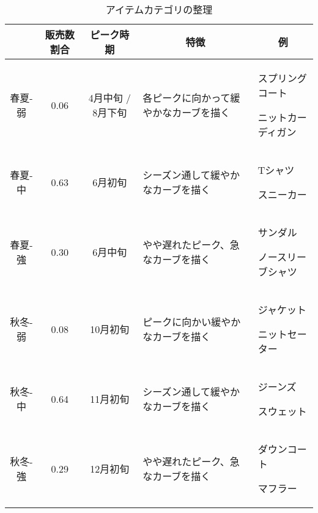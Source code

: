 \documentclass[dvipdfmx]{jreport}
\begin{document}

\begin{table}[h]
    \centering
    \caption{アイテムカテゴリの整理}\label{tab:01}
    \begin{tabular}{|p{}||p{}|p{}|p{}|p{}|} \hline
        \rowcolor{gray!20} %
         & \multicolumn{1}{c|}{\textbf{販売数割合}} & \multicolumn{1}{c|}{\textbf{ピーク時期}} & \multicolumn{1}{c|}{\textbf{特徴}} & \multicolumn{1}{c|}{\textbf{例}} \\ \hline \hline
         \multicolumn{1}{|c|}{春夏-弱} & \multicolumn{1}{c|}{0.06} & \multicolumn{1}{c|}{4月中旬 / 8月下旬} & 各ピークに向かって緩やかなカーブを描く & スプリングコート \par ニットカーディガン\\ \hline
         \multicolumn{1}{|c|}{春夏-中} & \multicolumn{1}{c|}{0.63} & \multicolumn{1}{c|}{6月初旬} & シーズン通して緩やかなカーブを描く & Tシャツ \par スニーカー\\ \hline
         \multicolumn{1}{|c|}{春夏-強} & \multicolumn{1}{c|}{0.30} & \multicolumn{1}{c|}{6月中旬} & やや遅れたピーク、急なカーブを描く & サンダル \par ノースリーブシャツ \\ \hline
         \multicolumn{1}{|c|}{秋冬-弱} & \multicolumn{1}{c|}{0.08} & \multicolumn{1}{c|}{10月初旬} & ピークに向かい緩やかなカーブを描く & ジャケット \par ニットセーター\\ \hline
         \multicolumn{1}{|c|}{秋冬-中} & \multicolumn{1}{c|}{0.64} & \multicolumn{1}{c|}{11月初旬} & シーズン通して緩やかなカーブを描く & ジーンズ \par スウェット\\ \hline
         \multicolumn{1}{|c|}{秋冬-強} & \multicolumn{1}{c|}{0.29} & \multicolumn{1}{c|}{12月初旬} & やや遅れたピーク、急なカーブを描く & ダウンコート \par マフラー \\ \hline
    \end{tabular}
\end{table}
\end{document}
